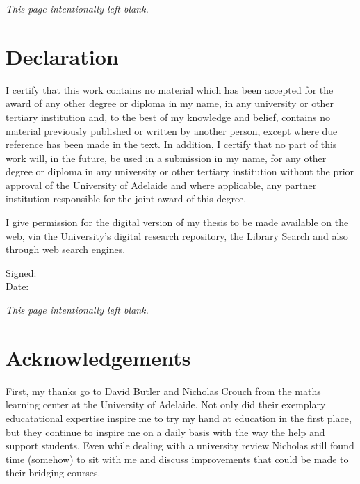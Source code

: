 \documentclass[twoside,12pt,a4paper]{report}
\makeatletter
\newcommand*{\intentionallyblankpage}{
  \vspace*{\fill}
  {\centering \textit{This page intentionally left blank.} \par}
  \vspace{\fill}}
\renewcommand*{\cleardoublepage}{\clearpage\if@twoside \ifodd\c@page\else
  \intentionallyblankpage
  \newpage
  \if@twocolumn\hbox{}\newpage\fi\fi\fi}
\makeatother
\begin{document}
\cleardoublepage
\chapter*{Declaration}

I certify that this work contains no material which has been accepted 
for the award of any other degree or diploma in my name, in any
university or other tertiary institution and, to the best of my knowledge 
and belief, contains no material previously published or written
by another person, except where due reference has been made in the 
text. In addition, I certify that no part of this work will, in the
future, be used in a submission in my name, for any other degree or 
diploma in any university or other tertiary institution without the
prior approval of the University of Adelaide and where applicable, any 
partner institution responsible for the joint-award of this degree.

I give permission for the digital version of my thesis to be made 
available on the web, via the University’s digital research repository,
the Library Search and also through web search engines.

\vspace{2cm}

\begin{flushleft}
Signed:  \\[15 pt]
Date:
\end{flushleft}





\cleardoublepage
\chapter*{Acknowledgements}

First, my thanks go to David Butler and Nicholas Crouch from the maths learning center at the University of Adelaide.
Not only did their exemplary educatational expertise inspire me to try my hand at education in the first place, but they 
continue to inspire me on a daily basis with the way the help and support students. Even while dealing with a university review Nicholas still found time (somehow) to sit with me and discuss improvements that could be made to their bridging courses. 
\end{document}
